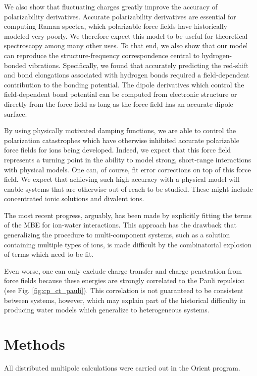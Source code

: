 \documentclass[journal=jctcce,manuscript=article]{achemso}
\begin{document}
We also show that fluctuating charges greatly improve the accuracy of polarizability derivatives. Accurate polarizability derivatives are essential for computing Raman spectra, which polarizable force fields have historically modeled very poorly. We therefore expect this model to be useful for theoretical spectroscopy among many other uses. To that end, we also show that our model can reproduce the structure-frequency correspondence central to hydrogen-bonded vibrations. Specifically, we found that accurately predicting the red-shift and bond elongations associated with hydrogen bonds required a field-dependent contribution to the bonding potential. The dipole derivatives which control the field-dependent bond potential can be computed from electronic structure or directly from the force field as long as the force field has an accurate dipole surface.

By using physically motivated damping functions, we are able to control the polarization catastrophes which have otherwise inhibited accurate polarizable force fields for ions being developed. Indeed, we expect that this force field represents a turning point in the ability to model strong, short-range interactions with physical models. One can, of course, fit error corrections on top of this force field. We expect that achieving such high accuracy with a physical model will enable systems that are otherwise out of reach to be studied. These might include concentrated ionic solutions and divalent ions.

The most recent
progress, arguably, has been made by explicitly fitting the terms of the MBE for
ion-water interactions.\cite{zhuang2022hydration,caruso2022accurate} This approach
has the drawback that generalizing the procedure to multi-component systems,
such as a solution containing multiple types of ions, is made difficult by
the combinatorial explosion of terms which need to be fit.

Even worse, one can only
exclude charge transfer and charge penetration from force fields because
these energies are strongly correlated to the Pauli repulsion (see Fig. \ref{fig:cp_ct_pauli}).
This correlation is not guaranteed to be consistent between systems, however,
which may explain part of the historical difficulty in producing water models which
generalize to heterogeneous systems.

\section*{Methods}
All distributed multipole calculations were carried out
in the Orient program.\cite{stone2002orient}
\end{document}

